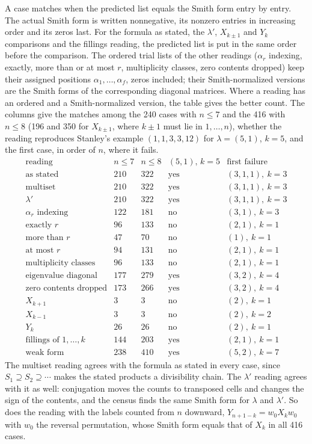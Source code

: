 A case matches when the predicted list equals the Smith form entry by entry.
The actual Smith form is written nonnegative, its nonzero entries in
increasing order and its zeros last. For the formula as stated, the
$\lambda'$, $X_{k\pm1}$ and $Y_k$ comparisons and the fillings reading, the
predicted list is put in the same order before the comparison. The ordered
trial lists of the other readings ($\alpha_r$ indexing, exactly, more than
or at most $r$, multiplicity classes, zero contents dropped) keep their
assigned positions $\alpha_1,\dots,\alpha_f$, zeros included; their
Smith-normalized versions are the Smith forms of the corresponding diagonal
matrices. Where a reading has an ordered and a Smith-normalized version, the
table gives the better count. The columns give
the matches among the 240 cases with $n\le7$ and the 416 with $n\le8$ (196
and 350 for $X_{k\pm1}$, where $k\pm1$ must lie in $1,\dots,n$), whether the
reading reproduces Stanley's example $(1,1,3,3,12)$ for $\lambda=(5,1)$,
$k=5$, and the first case, in order of $n$, where it fails.
\[
\begin{array}{lccll}
\text{reading} & n\le7 & n\le8 & (5,1),\,k=5 & \text{first failure}\\\hline
\text{as stated} & 210 & 322 & \text{yes} & (3,1,1),\ k=3\\
\text{multiset} & 210 & 322 & \text{yes} & (3,1,1),\ k=3\\
\lambda' & 210 & 322 & \text{yes} & (3,1,1),\ k=3\\
\alpha_r\text{ indexing} & 122 & 181 & \text{no} & (3,1),\ k=3\\
\text{exactly }r & 96 & 133 & \text{no} & (2,1),\ k=1\\
\text{more than }r & 47 & 70 & \text{no} & (1),\ k=1\\
\text{at most }r & 94 & 131 & \text{no} & (2,1),\ k=1\\
\text{multiplicity classes} & 96 & 133 & \text{no} & (2,1),\ k=1\\
\text{eigenvalue diagonal} & 177 & 279 & \text{yes} & (3,2),\ k=4\\
\text{zero contents dropped} & 173 & 266 & \text{yes} & (3,2),\ k=4\\
X_{k+1} & 3 & 3 & \text{no} & (2),\ k=1\\
X_{k-1} & 3 & 3 & \text{no} & (2),\ k=2\\
Y_k & 26 & 26 & \text{no} & (2),\ k=1\\
\text{fillings of }1,\dots,k & 144 & 203 & \text{yes} & (2,1),\ k=1\\
\text{weak form} & 238 & 410 & \text{yes} & (5,2),\ k=7
\end{array}
\]
The multiset reading agrees with the formula as stated in every case, since
$S_1\supseteq S_2\supseteq\cdots$ makes the stated products a divisibility
chain. The $\lambda'$ reading agrees with it as well: conjugation moves the
counts to transposed cells and changes the sign of the contents, and the
census finds the same Smith form for $\lambda$ and $\lambda'$. So does the
reading with the labels counted from $n$ downward, $Y_{n+1-k}=w_0X_kw_0$ with
$w_0$ the reversal permutation, whose Smith form equals that of $X_k$ in all
416 cases.

